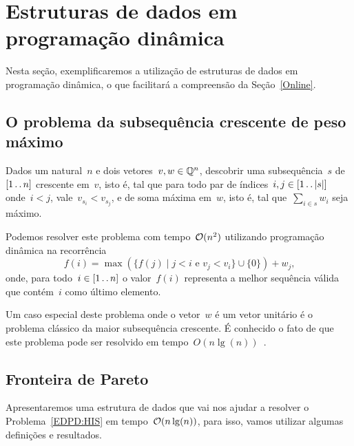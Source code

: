 \section{Estruturas de dados em programação dinâmica}
\label{EDPD}

Nesta seção, exemplificaremos a utilização de estruturas de dados em programação dinâmica, o que facilitará a compreensão da Seção~\ref{Online}.


\subsection{O problema da subsequência crescente de peso máximo}

\begin{prob} \label{EDPD:HIS}
Dados um natural~$n$ e dois vetores~$v,w \in \mathbb{Q}^n$, descobrir uma subsequência~$s$ de~$[1 \,.\,.\, n]$ crescente em~$v$, isto é, tal que para todo par de índices~$i,j \in [1 \,.\,.\, |s|]$ onde~$i < j$, vale~$v_{s_i} < v_{s_j}$, e de soma máxima em~$w$, isto é, tal que~$\sum\limits_{i \in s} w_i$ seja máximo.
\end{prob}

Podemos resolver este problema com tempo~$\mathcal{O}(n^2)$ utilizando programação dinâmica na recorrência
\begin{equation} \label{EDPD:HIS:rec}
f(i) = \max(\{f(j) \mid j < i \text{ e } v_j < v_i\} \cup \{0\}) + w_j \text{,}
\end{equation}
onde, para todo~$i \in [1 \,.\,.\, n]$ o valor~$f(i)$ representa a melhor sequência válida que contém~$i$ como último elemento.

Um caso especial deste problema onde o vetor~$w$ é um vetor unitário é o problema clássico da maior subsequência crescente. É conhecido o fato de que este problema pode ser resolvido em tempo~$O(n\lg(n))$~\cite{Fredman:1975}. 


\subsection{Fronteira de Pareto}

Apresentaremos uma estrutura de dados que vai nos ajudar a resolver o Problema~\ref{EDPD:HIS} em tempo~$\mathcal{O}(n\lg(n))$, para isso, vamos utilizar algumas definições e resultados.


